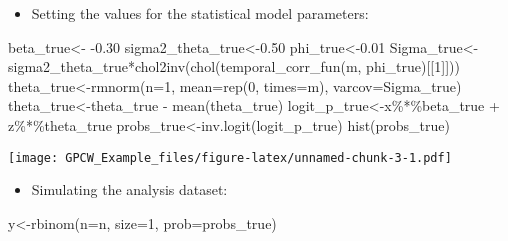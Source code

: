 \documentclass[
]{article}
\newenvironment{Shaded}{\begin{snugshade}}{\end{snugshade}}
\newcommand{\AttributeTok}[1]{\textcolor[rgb]{0.77,0.63,0.00}{#1}}
\newcommand{\DecValTok}[1]{\textcolor[rgb]{0.00,0.00,0.81}{#1}}
\newcommand{\FloatTok}[1]{\textcolor[rgb]{0.00,0.00,0.81}{#1}}
\newcommand{\FunctionTok}[1]{\textcolor[rgb]{0.00,0.00,0.00}{#1}}
\newcommand{\NormalTok}[1]{#1}
\newcommand{\OtherTok}[1]{\textcolor[rgb]{0.56,0.35,0.01}{#1}}
\newcommand{\SpecialCharTok}[1]{\textcolor[rgb]{0.00,0.00,0.00}{#1}}
\providecommand{\tightlist}{%
  \setlength{\itemsep}{0pt}\setlength{\parskip}{0pt}}
\begin{document}
\begin{itemize}
\tightlist
\item
  Setting the values for the statistical model parameters:
\end{itemize}

\begin{Shaded}
\begin{Highlighting}[]
\NormalTok{beta\_true}\OtherTok{\textless{}{-}} \SpecialCharTok{{-}}\FloatTok{0.30}
\NormalTok{sigma2\_theta\_true}\OtherTok{\textless{}{-}}\FloatTok{0.50}
\NormalTok{phi\_true}\OtherTok{\textless{}{-}}\FloatTok{0.01}
\NormalTok{Sigma\_true}\OtherTok{\textless{}{-}}\NormalTok{sigma2\_theta\_true}\SpecialCharTok{*}\FunctionTok{chol2inv}\NormalTok{(}\FunctionTok{chol}\NormalTok{(}\FunctionTok{temporal\_corr\_fun}\NormalTok{(m, }
\NormalTok{                                                              phi\_true)[[}\DecValTok{1}\NormalTok{]]))}
\NormalTok{theta\_true}\OtherTok{\textless{}{-}}\FunctionTok{rmnorm}\NormalTok{(}\AttributeTok{n=}\DecValTok{1}\NormalTok{, }
                   \AttributeTok{mean=}\FunctionTok{rep}\NormalTok{(}\DecValTok{0}\NormalTok{, }\AttributeTok{times=}\NormalTok{m), }
                   \AttributeTok{varcov=}\NormalTok{Sigma\_true)}
\NormalTok{theta\_true}\OtherTok{\textless{}{-}}\NormalTok{theta\_true }\SpecialCharTok{{-}} \FunctionTok{mean}\NormalTok{(theta\_true)}
\NormalTok{logit\_p\_true}\OtherTok{\textless{}{-}}\NormalTok{x}\SpecialCharTok{\%*\%}\NormalTok{beta\_true }\SpecialCharTok{+} 
\NormalTok{              z}\SpecialCharTok{\%*\%}\NormalTok{theta\_true}
\NormalTok{probs\_true}\OtherTok{\textless{}{-}}\FunctionTok{inv.logit}\NormalTok{(logit\_p\_true)}
\FunctionTok{hist}\NormalTok{(probs\_true)}
\end{Highlighting}
\end{Shaded}

\texttt{[image: GPCW\_Example\_files/figure-latex/unnamed-chunk-3-1.pdf]}

\begin{itemize}
\tightlist
\item
  Simulating the analysis dataset:
\end{itemize}

\begin{Shaded}
\begin{Highlighting}[]
\NormalTok{y}\OtherTok{\textless{}{-}}\FunctionTok{rbinom}\NormalTok{(}\AttributeTok{n=}\NormalTok{n, }
          \AttributeTok{size=}\DecValTok{1}\NormalTok{, }
          \AttributeTok{prob=}\NormalTok{probs\_true)}
\end{Highlighting}
\end{Shaded}
\end{document}

